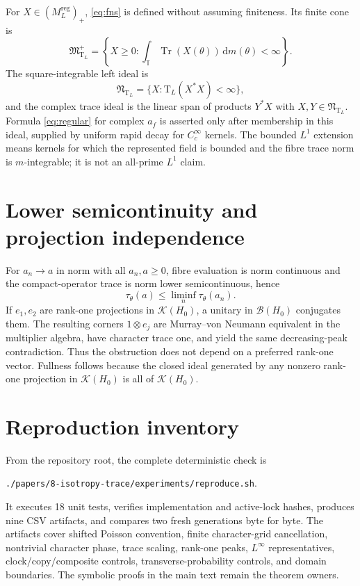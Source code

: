 \documentclass[11pt]{article}
\theoremstyle{definition}
\newcommand{\T}{\mathbb{T}}
\newcommand{\K}{\mathcal{K}}
\newcommand{\B}{\mathcal{B}}
\newcommand{\dd}{\,\mathrm{d}}
\newcommand{\Tr}{\operatorname{Tr}}
\newcommand{\Tau}{\mathrm{T}}
\begin{document}
For \(X\in(M_L^{\mathrm{reg}})_+\), \eqref{eq:fns} is defined without assuming finiteness.  Its finite cone is
\[
 \mathfrak M_{\Tau_L}^+=\left\{X\ge0:\int_{\T}\Tr(X(\theta))\dd m(\theta)<\infty\right\}.
\]
The square-integrable left ideal is
\[
 \mathfrak N_{\Tau_L}=\{X:\Tau_L(X^*X)<\infty\},
\]
and the complex trace ideal is the linear span of products \(Y^*X\) with \(X,Y\in\mathfrak N_{\Tau_L}\).  Formula \eqref{eq:regular} for complex \(a_f\) is asserted only after membership in this ideal, supplied by uniform rapid decay for \(C_c^\infty\) kernels.  The bounded \(L^1\) extension means kernels for which the represented field is bounded and the fibre trace norm is \(m\)-integrable; it is not an all-prime \(L^1\) claim.

\section{Lower semicontinuity and projection independence}

For \(a_n\to a\) in norm with all \(a_n,a\ge0\), fibre evaluation is norm continuous and the compact-operator trace is norm lower semicontinuous, hence
\[
 \tau_\theta(a)\le\liminf_n\tau_\theta(a_n).
\]
If \(e_1,e_2\) are rank-one projections in \(\K(H_0)\), a unitary in \(\B(H_0)\) conjugates them.  The resulting corners \(1\otimes e_j\) are Murray--von Neumann equivalent in the multiplier algebra, have character trace one, and yield the same decreasing-peak contradiction.  Thus the obstruction does not depend on a preferred rank-one vector.  Fullness follows because the closed ideal generated by any nonzero rank-one projection in \(\K(H_0)\) is all of \(\K(H_0)\).

\section{Reproduction inventory}

From the repository root, the complete deterministic check is
\begin{center}
\texttt{./papers/8-isotropy-trace/experiments/reproduce.sh}.
\end{center}
It executes 18 unit tests, verifies implementation and active-lock hashes, produces nine CSV artifacts, and compares two fresh generations byte for byte.  The artifacts cover shifted Poisson convention, finite character-grid cancellation, nontrivial character phase, trace scaling, rank-one peaks, \(L^\infty\) representatives, clock/copy/composite controls, transverse-probability controls, and domain boundaries.  The symbolic proofs in the main text remain the theorem owners.
\end{document}
